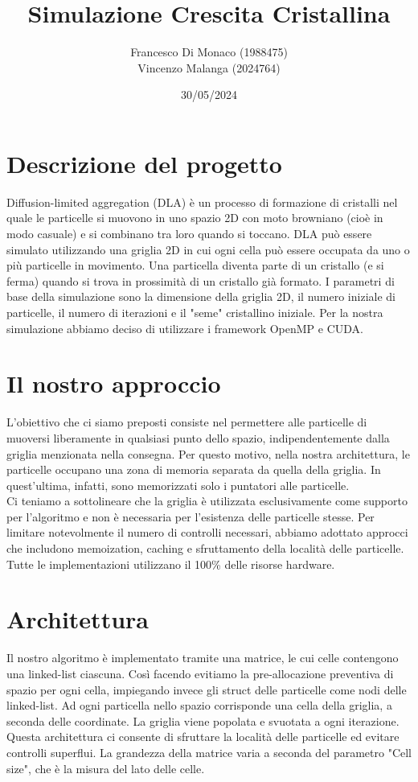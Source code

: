 \documentclass[12pt,a4paper,oneside]{article}
\title{Simulazione Crescita Cristallina}	%
\author{Francesco Di Monaco (1988475)  \\ Vincenzo Malanga (2024764)} %
\date{30/05/2024}	%
\theoremstyle{definition}
\begin{document}

\newpage
\tableofcontents
\newpage

\section{Descrizione del progetto}
Diffusion-limited aggregation (DLA) è un processo di formazione di cristalli nel quale le particelle si muovono in uno spazio 2D con moto browniano (cioè in modo casuale) e si combinano tra loro quando si toccano. DLA può essere simulato utilizzando una griglia 2D in cui ogni cella può essere occupata da uno o più particelle in movimento. 
Una particella diventa parte di un cristallo (e si ferma) quando si trova in prossimità di un cristallo già formato. I parametri di base della simulazione sono la dimensione della griglia 2D, il numero iniziale di particelle, il numero di iterazioni e il "seme" cristallino iniziale.
Per la nostra simulazione abbiamo deciso di utilizzare i framework OpenMP e CUDA.

\section{Il nostro approccio}
L'obiettivo che ci siamo preposti consiste nel permettere alle particelle di muoversi liberamente in qualsiasi punto dello spazio, indipendentemente dalla griglia menzionata nella consegna. Per questo motivo, nella nostra architettura, le particelle occupano una zona di memoria separata da quella della griglia. In quest'ultima, infatti, sono memorizzati solo i puntatori alle particelle. \\ Ci teniamo a sottolineare che la griglia è utilizzata esclusivamente come supporto per l'algoritmo e non è necessaria per l'esistenza delle particelle stesse.
Per limitare notevolmente il numero di controlli necessari, abbiamo adottato approcci che includono memoization, caching e sfruttamento della località delle particelle. \\
Tutte le implementazioni utilizzano il 100\% delle risorse hardware.

 
\newpage
\section{Architettura}
Il nostro algoritmo è implementato tramite una matrice, le cui celle contengono una linked-list ciascuna.
Così facendo evitiamo la pre-allocazione preventiva di spazio per ogni cella, impiegando invece gli struct delle particelle come nodi delle linked-list. Ad ogni particella nello spazio corrisponde una cella della griglia, a seconda delle coordinate. La griglia viene popolata e svuotata a ogni iterazione.
Questa architettura ci consente di sfruttare la località delle particelle ed evitare controlli superflui.
La grandezza della matrice varia a seconda del parametro "Cell size", che è la misura del lato delle celle.
\end{document}
